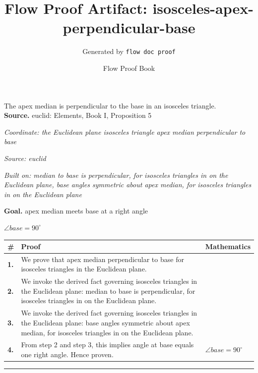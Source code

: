 \documentclass[11pt]{article}
\title{Flow Proof Artifact: isosceles-apex-perpendicular-base}
\author{Generated by \texttt{flow doc proof}}
\date{Flow Proof Book}
\theoremstyle{definition}
\begin{document}
\maketitle
The apex median is perpendicular to the base in an isosceles triangle.\\[0.5em]
\textbf{Source.} euclid: Elements, Book I, Proposition 5\\[0.5em]
\bigskip
{}\par
\smallskip\noindent\textit{Coordinate: the Euclidean plane \cdot isosceles triangle \cdot apex median perpendicular to base}\par
\smallskip\noindent\textit{Source: euclid}\par
\smallskip\noindent\textit{Built on: median to base is perpendicular, for isosceles triangles in on the Euclidean plane, base angles symmetric about apex median, for isosceles triangles in on the Euclidean plane}\par
\medskip
\noindent\textbf{Goal.} apex median meets base at a right angle\par
\noindent$\displaystyle \angle base = 90^\circ$\par
\medskip
\noindent
\begin{tabular}{@{} >{\raggedright\arraybackslash}p{} >{\raggedright\arraybackslash}p{} >{\raggedleft\arraybackslash}p{} @{}}
\textbf{\#} & \textbf{Proof} & \textbf{Mathematics} \\
\midrule
\textbf{1.} & We prove that apex median perpendicular to base for isosceles triangles in the Euclidean plane. & \\[0.45em]
\textbf{2.} & We invoke the derived fact governing isosceles triangles in the Euclidean plane: median to base is perpendicular, for isosceles triangles in on the Euclidean plane. & \\[0.45em]
\textbf{3.} & We invoke the derived fact governing isosceles triangles in the Euclidean plane: base angles symmetric about apex median, for isosceles triangles in on the Euclidean plane. & \\[0.45em]
\textbf{4.} & From step 2 and step 3, this implies angle at base equals one right angle. Hence proven. & $\displaystyle \angle base = 90^\circ$ \\[0.45em]
\bottomrule
\end{tabular}
\label{thm:Geometry-isosceles triangle-apex_median_perpendicular_to_base}
\par\medskip\hrule
\end{document}
